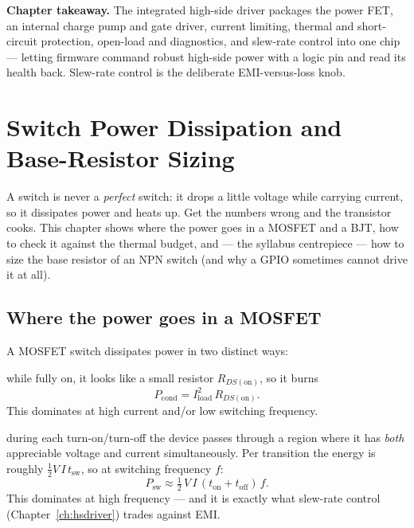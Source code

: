 \documentclass[11pt,a4paper,oneside]{book}
\begin{document}
\begin{keyidea}
\textbf{Chapter takeaway.} The integrated high-side driver packages the power FET,
an internal charge pump and gate driver, current limiting, thermal and
short-circuit protection, open-load and diagnostics, and slew-rate control into
one chip --- letting firmware command robust high-side power with a logic pin and
read its health back. Slew-rate control is the deliberate EMI-versus-loss knob.
\end{keyidea}

\chapter{Switch Power Dissipation and Base-Resistor Sizing}
\label{ch:dissipation}

A switch is never a \emph{perfect} switch: it drops a little voltage while
carrying current, so it dissipates power and heats up. Get the numbers wrong and
the transistor cooks. This chapter shows where the power goes in a MOSFET and a
BJT, how to check it against the thermal budget, and --- the syllabus centrepiece
--- how to size the base resistor of an NPN switch (and why a GPIO sometimes
cannot drive it at all).

\section{Where the power goes in a MOSFET}
A MOSFET switch dissipates power in two distinct ways:
\begin{description}[leftmargin=1.6cm,style=nextline]
  \item[Conduction loss] while fully on, it looks like a small resistor
        $R_{DS(\text{on})}$, so it burns
        \[ P_{\text{cond}} = I_{\text{load}}^2 \, R_{DS(\text{on})}. \]
        This dominates at high current and/or low switching frequency.
  \item[Switching loss] during each turn-on/turn-off the device passes through a
        region where it has \emph{both} appreciable voltage and current
        simultaneously. Per transition the energy is roughly
        $\tfrac{1}{2}V\,I\,t_{\text{sw}}$, so at switching frequency $f$:
        \[ P_{\text{sw}} \approx \tfrac{1}{2}\,V\,I\,(t_{\text{on}}+t_{\text{off}})\,f. \]
        This dominates at high frequency --- and it is exactly what slew-rate
        control (Chapter~\ref{ch:hsdriver}) trades against EMI.
\end{description}
\end{document}

